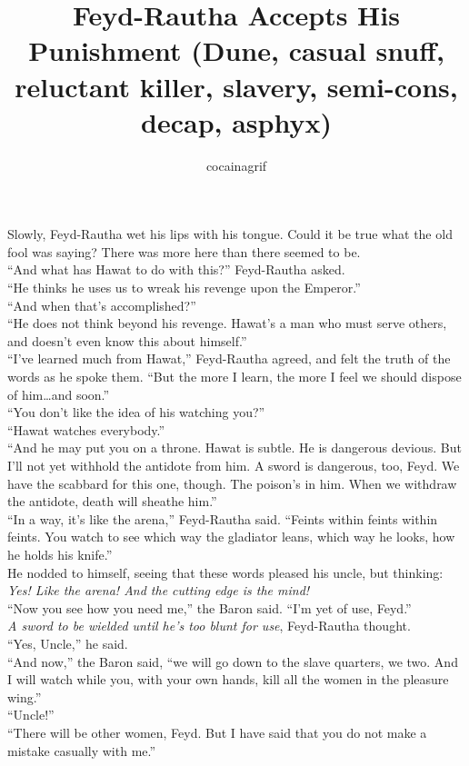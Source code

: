 \documentclass[12pt,letterpaper]{memoir}
\author{cocainagrif}
\title{Feyd-Rautha Accepts His Punishment (Dune, casual snuff, reluctant killer, slavery, semi-cons, decap, asphyx)}
\date{}
\begin{document}
\maketitle


Slowly, Feyd-Rautha wet his lips with his tongue. Could it be true what the old fool was saying? There was more here than there seemed to be.\\
“And what has Hawat to do with this?” Feyd-Rautha asked.\\
“He thinks he uses us to wreak his revenge upon the Emperor.”\\
“And when that’s accomplished?”\\
“He does not think beyond his revenge. Hawat’s a man who must serve others, and doesn’t even know this about himself.”\\
“I’ve learned much from Hawat,” Feyd-Rautha agreed, and felt the truth of the words as he spoke them. “But the more I learn, the more I feel we should dispose of him\ldots and  soon.”\\
“You don’t like the idea of his watching you?”\\
“Hawat watches everybody.”\\
“And he may put you on a throne. Hawat is subtle. He is dangerous 
devious. But I’ll not yet withhold the antidote from him. A sword is dangerous, too, Feyd. We have the scabbard for this one, though. The poison’s in him. When we withdraw the antidote, death will sheathe him.”\\
“In a way, it’s like the arena,” Feyd-Rautha said. “Feints within feints within feints. You watch to see which way the gladiator leans, which way he looks, how he holds his knife.”\\
He nodded to himself, seeing that these words pleased his uncle, but thinking: \textit{Yes! Like the arena! And the cutting edge is the mind!}\\
“Now you see how you need me,” the Baron said. “I’m yet of use, Feyd.”\\
\textit{A sword to be wielded until he’s too blunt for use}, Feyd-Rautha thought.\\
“Yes, Uncle,” he said.\\
“And now,” the Baron said, “we will go down to the slave quarters, we two. And I will watch while you, with your own hands, kill all the women in the pleasure wing.”\\
“Uncle!”\\
“There will be other women, Feyd. But I have said that you do not make a mistake casually with me.”\\
\end{document}
